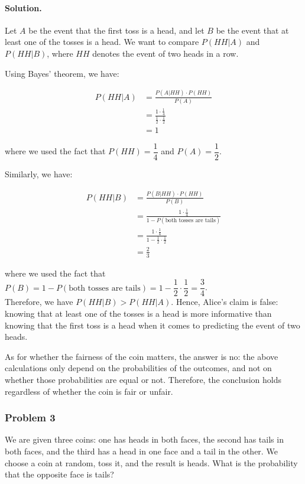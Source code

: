 \paragraph{Solution.} Let $A$ be the event that the first toss is a head, and let $B$ be the event that at least one of the tosses is a head. We want to compare $P(HH | A)$ and $P(HH | B)$, where $HH$ denotes the event of two heads in a row.

Using Bayes' theorem, we have:

\begin{align*}
    P(HH | A) & = \frac{P(A | HH) \cdot P(HH)}{P(A)}                        \\
              & = \frac{1 \cdot \frac{1}{4}}{\frac{1}{2} \cdot \frac{1}{2}} \\
              & = 1
\end{align*}

where we used the fact that $P(HH) = \dfrac{1}{4}$ and $P(A) = \dfrac{1}{2}$.

Similarly, we have:

\begin{align*}
    P(HH | B) & = \frac{P(B | HH) \cdot P(HH)}{P(B)}                              \\
              & = \frac{1 \cdot \frac{1}{4}}{1 - P(\text{both tosses are tails})} \\
              & = \frac{1 \cdot \frac{1}{4}}{1 - \frac{1}{2} \cdot \frac{1}{2}}   \\
              & = \frac{2}{3}
\end{align*}

where we used the fact that $P(B) = 1 - P(\text{both tosses are tails}) = 1 - \dfrac{1}{2} \cdot \dfrac{1}{2} = \dfrac{3}{4}$.\\

Therefore, we have $P(HH | B) > P(HH | A)$. Hence, Alice's claim is false: knowing that at least one of the tosses is a head is more informative than knowing that the first toss is a head when it comes to predicting the event of two heads.

As for whether the fairness of the coin matters, the answer is no: the above calculations only depend on the probabilities of the outcomes, and not on whether those probabilities are equal or not. Therefore, the conclusion holds regardless of whether the coin is fair or unfair.

\newpage
\subsubsection{Problem 3} We are given three coins: one has heads in both faces, the second has tails in both faces, and the third has a head in one face and a tail in the other. We choose a coin at random, toss it, and the result is heads. What is the probability that the opposite face is tails?

